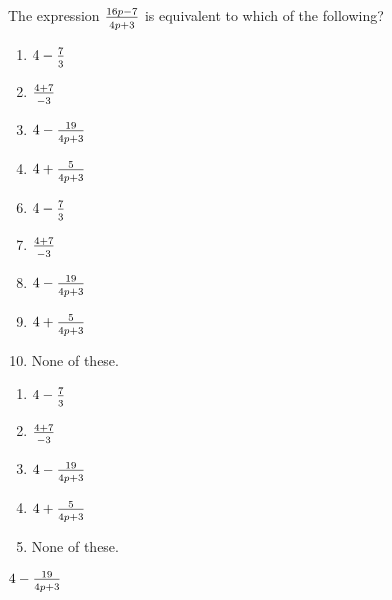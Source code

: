  
The expression {\Large $\frac{16p-7\rule{0mm}{3mm}}{\rule{0mm}{2.5mm}4p+3}$} is equivalent to which of the following?


\ifsat
	\begin{enumerate}[label=\Alph*)]
		\item {\Large$4 - \frac{7}{\rule{0mm}{2.5mm}3} $ }
		\item {\Large$\frac{4+7}{\rule{0mm}{2.5mm}-3} $ }
		\item {\Large$4-\frac{19}{\rule{0mm}{2.5mm}4p+3} $ } %
		\item {\Large$4+\frac{5}{\rule{0mm}{2.5mm}4p+3} $}
	\end{enumerate}
\else
\fi

\ifacteven
	\begin{enumerate}[label=\textbf{\Alph*.},itemsep=\fill,align=left]
		\setcounter{enumii}{5}
		\item {\Large$4 - \frac{7}{\rule{0mm}{2.5mm}3} $ }
		\item {\Large$\frac{4+7}{\rule{0mm}{2.5mm}-3} $ }
		\item {\Large$4-\frac{19}{\rule{0mm}{2.5mm}4p+3} $ } %
		\addtocounter{enumii}{1}
		\item {\Large$4+\frac{5}{\rule{0mm}{2.5mm}4p+3} $}
		\item None of these. 
	\end{enumerate}
\else
\fi

\ifactodd
	\begin{enumerate}[label=\textbf{\Alph*.},itemsep=\fill,align=left]
		\item {\Large$4 - \frac{7}{\rule{0mm}{2.5mm}3} $ }
		\item {\Large$\frac{4+7}{\rule{0mm}{2.5mm}-3} $ }
		\item {\Large$4-\frac{19}{\rule{0mm}{2.5mm}4p+3} $ } %
		\item {\Large$4+\frac{5}{\rule{0mm}{2.5mm}4p+3} $}
		\item None of these. 
	\end{enumerate}
\else
\fi

\ifgridin
 {\Large$4-\frac{19}{\rule{0mm}{2.5mm}4p+3} $ } %
		
\else
\fi

